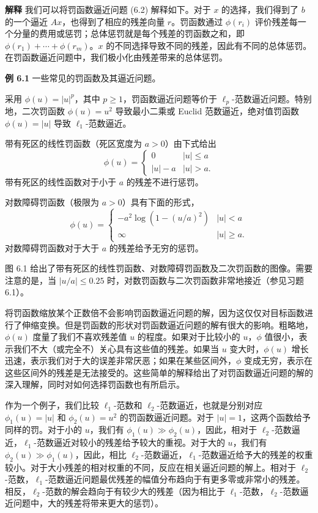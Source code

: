 \documentclass[UTF8, 12pt, fontset=fandol, oneside]{ctexart}
\begin{document}
\noindent\textbf{解释}\quad
我们可以将罚函数逼近问题 (6.2) 解释如下。对于 $x$ 的选择，我们得到了 $b$ 的一个逼近 $Ax$，也得到了相应的残差向量 $r$。罚函数通过 $\phi(r_i)$ 评价残差每一个分量的费用或惩罚；总体惩罚就是每个残差的罚函数之和，即 $\phi(r_1)+\cdots+\phi(r_m)$。$x$ 的不同选择导致不同的残差，因此有不同的总体惩罚。在罚函数逼近问题中，我们极小化由残差带来的总体惩罚。

\noindent\textbf{例 6.1}\quad
一些常见的罚函数及其逼近问题。

采用 $\phi(u)=|u|^p$，其中 $p\geq 1$，罚函数逼近问题等价于 $\ell_p$-范数逼近问题。特别地，二次罚函数 $\phi(u)=u^2$ 导致最小二乘或 Euclid 范数逼近，绝对值罚函数 $\phi(u)=|u|$ 导致 $\ell_1$-范数逼近。

带有死区的线性罚函数（死区宽度为 $a>0$）由下式给出
\[
\phi(u)=
\begin{cases}
0 & |u|\leq a\\
|u|-a & |u|>a.
\end{cases}
\]
带有死区的线性函数对于小于 $a$ 的残差不进行惩罚。

对数障碍罚函数（极限为 $a>0$）具有下面的形式，
\[
\phi(u)=
\begin{cases}
-a^2\log(1-(u/a)^2) & |u|<a\\
\infty & |u|\geq a.
\end{cases}
\]
对数障碍罚函数对于大于 $a$ 的残差给予无穷的惩罚。

图 6.1 给出了带有死区的线性罚函数、对数障碍罚函数及二次罚函数的图像。需要注意的是，当 $|u/a|\leq 0.25$ 时，对数罚函数与二次罚函数非常地接近（参见习题 6.1）。

将罚函数缩放某个正数倍不会影响罚函数逼近问题的解，因为这仅仅对目标函数进行了伸缩变换。但是罚函数的形状对罚函数逼近问题的解有很大的影响。粗略地，$\phi(u)$ 度量了我们不喜欢残差值 $u$ 的程度。如果对于比较小的 $u$，$\phi$ 值很小，表示我们不大（或完全不）关心具有这些值的残差。如果当 $u$ 变大时，$\phi(u)$ 增长迅速，表示我们对于大的误差非常厌恶；如果在某些区间外，$\phi$ 变成无穷，表示在这些区间外的残差是无法接受的。这些简单的解释给出了对罚函数逼近问题的解的深入理解，同时对如何选择罚函数也有所启示。

作为一个例子，我们比较 $\ell_1$-范数和 $\ell_2$-范数逼近，也就是分别对应 $\phi_1(u)=|u|$ 和 $\phi_2(u)=u^2$ 的罚函数逼近问题。对于 $|u|=1$，这两个函数给予同样的罚。对于小的 $u$，我们有 $\phi_1(u)\gg \phi_2(u)$，因此，相对于 $\ell_2$-范数逼近，$\ell_1$-范数逼近对较小的残差给予较大的重视。对于大的 $u$，我们有 $\phi_2(u)\gg \phi_1(u)$，因此，相比 $\ell_2$-范数逼近，$\ell_1$-范数逼近给予大的残差的权重较小。对于大小残差的相对权重的不同，反应在相关逼近问题的解上。相对于 $\ell_2$-范数，$\ell_1$-范数逼近问题最优残差的幅值分布趋向于有更多零或非常小的残差。相反，$\ell_2$-范数的解会趋向于有较少大的残差（因为相比于 $\ell_1$-范数，$\ell_2$-范数逼近问题中，大的残差将带来更大的惩罚）。
\end{document}
